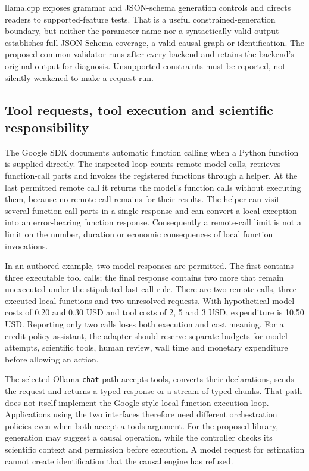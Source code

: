 llama.cpp exposes grammar and JSON-schema generation controls and directs
readers to supported-feature tests. That is a useful constrained-generation
boundary, but neither the parameter name nor a syntactically valid output
establishes full JSON Schema coverage, a valid causal graph or identification.
The proposed common validator runs after every backend and retains the
backend's original output for diagnosis. Unsupported constraints must be
reported, not silently weakened to make a request run.
\citep{exec24_backend_llamacpp,exec24_backend_reference}

\subsection{Tool requests, tool execution and scientific responsibility}

The Google SDK documents automatic function calling when a Python function
is supplied directly. The inspected loop counts remote model calls, retrieves
function-call parts and invokes the registered functions through a helper.
At the last permitted remote call it returns the model's function calls
without executing them, because no remote call remains for their results.
The helper can visit several function-call parts in a single response and
can convert a local exception into an error-bearing function response.
Consequently a remote-call limit is not a limit on the number, duration or
economic consequences of local function invocations.
\citep{exec24_backend_google}

In an authored example, two model responses are permitted. The first contains
three executable tool calls; the final response contains two more that remain
unexecuted under the stipulated last-call rule. There are two remote calls,
three executed local functions and two unresolved requests. With hypothetical
model costs of 0.20 and 0.30 USD and tool costs of 2, 5 and 3 USD, expenditure
is 10.50 USD. Reporting only two calls loses both execution and cost meaning.
For a credit-policy assistant, the adapter should reserve separate budgets
for model attempts, scientific tools, human review, wall time and monetary
expenditure before allowing an action.
\citep{exec24_backend_reference}

The selected Ollama \texttt{chat} path accepts tools, converts their
declarations, sends the request and returns a typed response or a stream of
typed chunks. That path does not itself implement the Google-style local
function-execution loop. Applications using the two interfaces therefore
need different orchestration policies even when both accept a tools argument.
For the proposed library, generation may suggest a causal operation, while
the controller checks its scientific context and permission before execution.
A model request for estimation cannot create identification that the causal
engine has refused.~\citep{exec24_backend_ollama,exec24_backend_reference}

